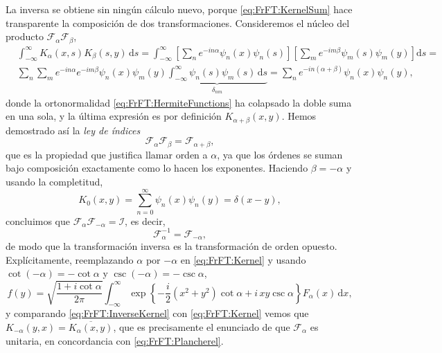 			La inversa se obtiene sin ningún cálculo nuevo, porque \eqref{eq:FrFT:KernelSum} hace transparente la composición de dos transformaciones. Consideremos el núcleo del producto $\mathcal{F}_{\alpha}\mathcal{F}_{\beta}$,
			\begin{align*}
				& \int_{-\infty}^{\infty}K_{\alpha}(x,s)K_{\beta}(s,y)\,\mathrm{d}s = \int_{-\infty}^{\infty}\left[\sum_{n}e^{-in\alpha}\psi_{n}(x)\psi_{n}(s)\right]\left[\sum_{m}e^{-im\beta}\psi_{m}(s)\psi_{m}(y)\right]\mathrm{d}s = \\
				& \sum_{n}\sum_{m}e^{-in\alpha}e^{-im\beta}\psi_{n}(x)\psi_{m}(y)\underbrace{\int_{-\infty}^{\infty}\psi_{n}(s)\psi_{m}(s)\,\mathrm{d}s}_{\delta_{nm}} = \sum_{n}e^{-in\left(\alpha+\beta\right)}\psi_{n}(x)\psi_{n}(y),
			\end{align*}
			donde la ortonormalidad \eqref{eq:FrFT:HermiteFunctions} ha colapsado la doble suma en una sola, y la última expresión es por definición $K_{\alpha+\beta}(x,y)$. Hemos demostrado así la \textit{ley de índices}
			\begin{equation}\label{eq:FrFT:IndexLaw}
				\mathcal{F}_{\alpha}\mathcal{F}_{\beta} = \mathcal{F}_{\alpha+\beta},
			\end{equation}
			que es la propiedad que justifica llamar orden a $\alpha$, ya que los órdenes se suman bajo composición exactamente como lo hacen los exponentes. Haciendo $\beta = -\alpha$ y usando la completitud,
			\begin{equation}\label{eq:FrFT:Completeness}
				K_{0}(x,y) = \sum_{n=0}^{\infty}\psi_{n}(x)\psi_{n}(y) = \delta(x-y),
			\end{equation}
			concluimos que $\mathcal{F}_{\alpha}\mathcal{F}_{-\alpha} = \mathcal{I}$, es decir,
			\begin{equation}\label{eq:FrFT:Inverse}
				\mathcal{F}_{\alpha}^{-1} = \mathcal{F}_{-\alpha},
			\end{equation}
			de modo que la transformación inversa es la transformación de orden opuesto. Explícitamente, reemplazando $\alpha$ por $-\alpha$ en \eqref{eq:FrFT:Kernel} y usando $\cot(-\alpha) = -\cot\alpha$ y $\csc(-\alpha) = -\csc\alpha$,
			\begin{equation}\label{eq:FrFT:InverseKernel}
				f(y) = \sqrt{\frac{1+i\cot\alpha}{2\pi}}\int_{-\infty}^{\infty}\exp\left\{-\frac{i}{2}\left(x^{2}+y^{2}\right)\cot\alpha + i\,xy\csc\alpha\right\}F_{\alpha}(x)\,\mathrm{d}x,
			\end{equation}
			y comparando \eqref{eq:FrFT:InverseKernel} con \eqref{eq:FrFT:Kernel} vemos que $K_{-\alpha}(y,x) = \overline{K_{\alpha}(x,y)}$, que es precisamente el enunciado de que $\mathcal{F}_{\alpha}$ es unitaria, en concordancia con \eqref{eq:FrFT:Plancherel}.

